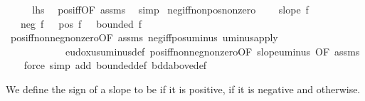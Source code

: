 \begin{isabellebody}
\ \ \isamarkupfalse%
\ \isamarkupfalse%
\ {\isacharquery}{\kern0pt}lhs\ \isamarkupfalse%
\ pos{\isacharunderscore}{\kern0pt}iff{\isacharbrackleft}{\kern0pt}OF\ assms{\isacharbrackright}{\kern0pt}\ \isamarkupfalse%
\ simp\isanewline
{}\isamarkupfalse%
%
\endisatagproof
{\isafoldproof}%
%
\isadelimproof
\isanewline
%
\endisadelimproof
\isanewline
{}\isamarkupfalse%
\ neg{\isacharunderscore}{\kern0pt}iff{\isacharunderscore}{\kern0pt}nonpos{\isacharunderscore}{\kern0pt}nonzero{\isacharcolon}{\kern0pt}\ \isanewline
\ \ \ {\isachardoublequoteopen}slope\ f{\isachardoublequoteclose}\isanewline
\ \ \ {\isachardoublequoteopen}neg\ f\ {\isasymlongleftrightarrow}\ {\isacharparenleft}{\kern0pt}{\isasymnot}\ pos\ f{\isacharparenright}{\kern0pt}\ {\isasymand}\ {\isacharparenleft}{\kern0pt}{\isasymnot}\ bounded\ f{\isacharparenright}{\kern0pt}{\isachardoublequoteclose}\isanewline
%
\isadelimproof
\ \ %
\endisadelimproof
%
\isatagproof
{}\isamarkupfalse%
\ pos{\isacharunderscore}{\kern0pt}iff{\isacharunderscore}{\kern0pt}nonneg{\isacharunderscore}{\kern0pt}nonzero{\isacharbrackleft}{\kern0pt}OF\ assms{\isacharbrackright}{\kern0pt}\ neg{\isacharunderscore}{\kern0pt}iff{\isacharunderscore}{\kern0pt}pos{\isacharunderscore}{\kern0pt}uminus\ uminus{\isacharunderscore}{\kern0pt}apply\ \isanewline
\ \ \ \ \ \ \ \ \ \ \ \ eudoxus{\isacharunderscore}{\kern0pt}uminus{\isacharunderscore}{\kern0pt}def\ pos{\isacharunderscore}{\kern0pt}iff{\isacharunderscore}{\kern0pt}nonneg{\isacharunderscore}{\kern0pt}nonzero{\isacharbrackleft}{\kern0pt}OF\ slope{\isacharunderscore}{\kern0pt}uminus{\isacharprime}{\kern0pt}{\isacharcomma}{\kern0pt}\ OF\ assms{\isacharbrackright}{\kern0pt}\isanewline
\ \ \isamarkupfalse%
\ {\isacharparenleft}{\kern0pt}force\ simp\ add{\isacharcolon}{\kern0pt}\ bounded{\isacharunderscore}{\kern0pt}def\ bdd{\isacharunderscore}{\kern0pt}above{\isacharunderscore}{\kern0pt}def{\isacharparenright}{\kern0pt}%
\endisatagproof
{\isafoldproof}%
%
\isadelimproof
%
\endisadelimproof
%
\begin{isamarkuptext}%
We define the sign of a slope to be  if it is positive,  if it is negative and  otherwise.%
\end{isamarkuptext}\isamarkuptrue%

\end{isabellebody}
